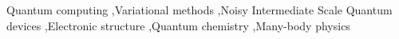\documentclass[a4paper,fleqn]{cas-sc}
\begin{document}

\begin{keywords}
Quantum computing \sep Variational methods \sep Noisy Intermediate Scale Quantum devices \sep Electronic structure \sep Quantum chemistry \sep Many-body physics
\end{keywords}

\maketitle
\tableofcontents 









%
%
%
%
%
%
% 
% 
% 
% 
% 
\end{document}
